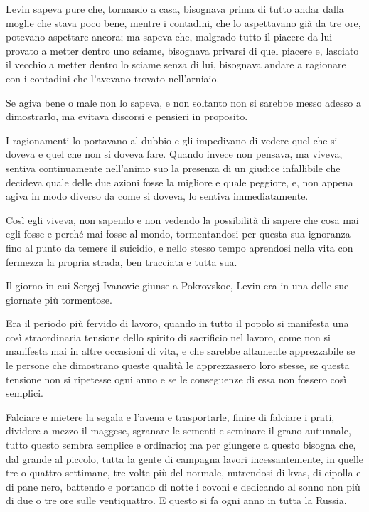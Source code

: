 Levin sapeva pure che, tornando a casa, bisognava prima di tutto andar dalla moglie che stava poco bene, mentre i contadini, che lo aspettavano già da tre ore, potevano aspettare ancora; ma sapeva che, malgrado tutto il piacere da lui provato a metter dentro uno sciame, bisognava privarsi di quel piacere e, lasciato il vecchio a metter dentro lo sciame senza di lui, bisognava andare a ragionare con i contadini che l'avevano trovato nell'arniaio. 

Se agiva bene o male non lo sapeva, e non soltanto non si sarebbe messo adesso a dimostrarlo, ma evitava discorsi e pensieri in proposito. 

I ragionamenti lo portavano al dubbio e gli impedivano di vedere quel che si doveva e quel che non si doveva fare. Quando invece non pensava, ma viveva, sentiva continuamente nell'animo suo la presenza di un giudice infallibile che decideva quale delle due azioni fosse la migliore e quale peggiore, e, non appena agiva in modo diverso da come si doveva, lo sentiva immediatamente. 

Così egli viveva, non sapendo e non vedendo la possibilità di sapere che cosa mai egli fosse e perché mai fosse al mondo, tormentandosi per questa sua ignoranza fino al punto da temere il suicidio, e nello stesso tempo aprendosi nella vita con fermezza la propria strada, ben tracciata e tutta sua. 

\label{xi-7} 

Il giorno in cui Sergej Ivanovic giunse a Pokrovskoe, Levin era in una delle sue giornate più tormentose. 

Era il periodo più fervido di lavoro, quando in tutto il popolo si manifesta una così straordinaria tensione dello spirito di sacrificio nel lavoro, come non si manifesta mai in altre occasioni di vita, e che sarebbe altamente apprezzabile se le persone che dimostrano queste qualità le apprezzassero loro stesse, se questa tensione non si ripetesse ogni anno e se le conseguenze di essa non fossero così semplici. 

Falciare e mietere la segala e l'avena e trasportarle, finire di falciare i prati, dividere a mezzo il maggese, sgranare le sementi e seminare il grano autunnale, tutto questo sembra semplice e ordinario; ma per giungere a questo bisogna che, dal grande al piccolo, tutta la gente di campagna lavori incessantemente, in quelle tre o quattro settimane, tre volte più del normale, nutrendosi di kvas, di cipolla e di pane nero, battendo e portando di notte i covoni e dedicando al sonno non più di due o tre ore sulle ventiquattro. E questo si fa ogni anno in tutta la Russia. 

